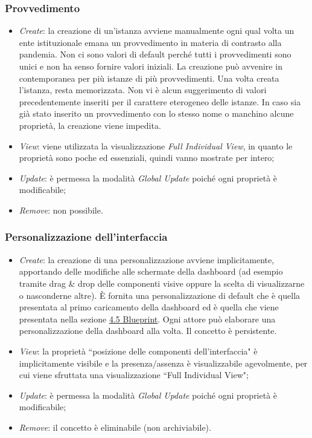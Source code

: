 \subsubsection{Provvedimento}
\label{sss:operazioni-provvedimento}
\begin{itemize}
    \item \textit{Create}: la creazione di un'istanza avviene manualmente ogni qual volta un ente istituzionale emana un provvedimento in materia di contrasto alla pandemia.
    Non ci sono valori di default perché tutti i provvedimenti sono unici e non ha senso fornire valori iniziali.
    La creazione può avvenire in contemporanea per più istanze di più provvedimenti.
    Una volta creata l'istanza, resta memorizzata.
    Non vi è alcun suggerimento di valori precedentemente inseriti per il carattere eterogeneo delle istanze.
    In caso sia già stato inserito un provvedimento con lo stesso nome o manchino alcune proprietà, la creazione viene impedita.
    \item \textit{View}: viene utilizzata la visualizzazione \textit{Full Individual View}, in quanto le proprietà sono poche ed essenziali, quindi vanno mostrate per intero;
    \item \textit{Update}: è permessa la modalità \textit{Global Update} poiché ogni proprietà è modificabile;
    \item \textit{Remove}: non possibile.
\end{itemize}

\subsubsection{Personalizzazione dell'interfaccia}
\label{sss:operazioni-personalizzazione-interfaccia}
\begin{itemize}
    \item \textit{Create}: la creazione di una personalizzazione avviene implicitamente, apportando delle modifiche alle schermate della dashboard (ad esempio tramite drag \& drop delle componenti visive oppure la scelta di visualizzarne o nasconderne altre).
    È fornita una personalizzazione di default che è quella presentata al primo caricamento della dashboard ed è quella che viene presentata nella sezione \hyperref[s:struttura-blueprint]{4.5 Blueprint}.
    Ogni attore può elaborare una personalizzazione della dashboard alla volta.
    Il concetto è persistente.
    \item \textit{View}: la proprietà ``posizione delle componenti dell'interfaccia" è implicitamente visibile e la presenza/assenza è visualizzabile agevolmente, per cui viene sfruttata una visualizzazione ``Full Individual View";
    \item \textit{Update}: è permessa la modalità \textit{Global Update} poiché ogni proprietà è modificabile;
    \item \textit{Remove}: il concetto è eliminabile (non archiviabile).
\end{itemize}